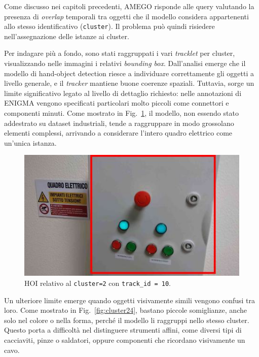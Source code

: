 Come discusso nei capitoli precedenti, AMEGO risponde alle query valutando la presenza di \emph{overlap} temporali tra oggetti che il modello considera appartenenti allo stesso identificativo (\texttt{cluster}). Il problema può quindi risiedere nell'assegnazione delle istanze ai cluster.  

Per indagare più a fondo, sono stati raggruppati i vari \emph{tracklet} per cluster, visualizzando nelle immagini i relativi \emph{bounding box}. Dall'analisi emerge che il modello di hand-object detection riesce a individuare correttamente gli oggetti a livello generale, e il \emph{tracker} mantiene buone coerenze spaziali. Tuttavia, sorge un limite significativo legato al livello di dettaglio richiesto: nelle annotazioni di ENIGMA vengono specificati particolari molto piccoli come connettori e componenti minuti. Come mostrato in Fig.~\ref{fig:cluster2-10}, il modello, non essendo stato addestrato su dataset industriali, tende a raggruppare in modo grossolano elementi complessi, arrivando a considerare l'intero quadro elettrico come un'unica istanza.

\begin{figure}[ht]
    \centering
    \includegraphics[width=0.6\linewidth]{Images/cluster2-10.jpg}
    \caption{HOI relativo al \texttt{cluster=2} con \texttt{track\_id = 10}.}
    \label{fig:cluster2-10}
\end{figure}

Un ulteriore limite emerge quando oggetti visivamente simili vengono confusi tra loro. Come mostrato in Fig.~\ref{fig:cluster24}, bastano piccole somiglianze, anche solo nel colore o nella forma, perché il modello li raggruppi nello stesso cluster. Questo porta a difficoltà nel distinguere strumenti affini, come diversi tipi di cacciaviti, pinze o saldatori, oppure componenti che ricordano visivamente un cavo.

